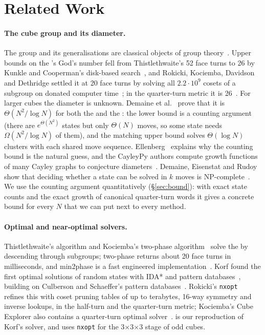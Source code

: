 \section{Related Work}
\label{sec:related}

\paragraph{The cube group and its diameter.}
The  group and its generalisations are classical objects of group theory~\cite{singmaster1981notes,joyner2008adventures}.
Upper bounds on the 's God's number fell from Thistlethwaite's 52 face turns to 26 by
Kunkle and Cooperman's disk-based search~\cite{kunkle2007twentysix}, and Rokicki, Kociemba, Davidson and
Dethridge settled it at 20 face turns by solving all $2.2\cdot10^9$ cosets of a subgroup on donated
computer time~\cite{rokicki2014diameter}; in the quarter-turn metric it is 26~\cite{rokicki2014qtm}. For larger
cubes the diameter is unknown. Demaine et al.~\cite{demaine2011algorithms} prove that it is $\Theta(N^2/\log N)$
for both the  and the : the lower bound is a counting argument (there are $e^{\Theta(N^2)}$ states
but only $\Theta(N)$ moves, so some state needs $\Omega(N^2/\log N)$ of them), and the matching upper bound
solves $\Theta(\log N)$ clusters with each shared move sequence. Ellenberg~\cite{ellenberg2011diameter}
explains why the counting bound is the natural guess, and the CayleyPy authors compute growth functions of
many Cayley graphs to conjecture diameters~\cite{chervov2025growth}. Demaine, Eisenstat and Rudoy show that
deciding whether a  state can be solved in $k$ moves is NP-complete~\cite{demaine2018npcomplete}. We use
the counting argument quantitatively (\S\ref{sec:bound}): with exact state counts and the exact growth of
canonical quarter-turn words it gives a concrete bound for every $N$ that we can put next to every method.

\paragraph{Optimal and near-optimal  solvers.}
Thistlethwaite's algorithm and Kociemba's two-phase algorithm~\cite{kociemba2phase} solve the  by
descending through subgroups; two-phase returns about 20 face turns in milliseconds, and min2phase is a fast
engineered implementation~\cite{chen2phase}. Korf found the first optimal solutions of random states with
IDA* and pattern databases~\cite{korf1997optimal}, building on Culberson and Schaeffer's pattern
databases~\cite{culberson1998pattern}. Rokicki's \texttt{nxopt}~\cite{rokicki2018nxopt} refines this with coset
pruning tables of up to terabytes, 16-way symmetry and inverse lookups, in the half-turn and the quarter-turn
metric; Kociemba's Cube Explorer also contains a quarter-turn optimal solver~\cite{kociemba2qtm}. \Mone is our
reproduction of Korf's solver, and \Mseven uses \texttt{nxopt} for the 3$\times$3$\times$3 stage of odd cubes.

